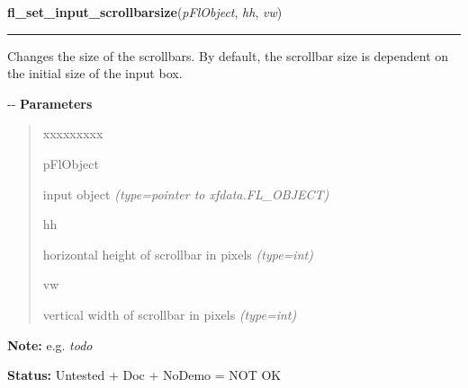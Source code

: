\hspace{.8\funcindent}\begin{boxedminipage}{\funcwidth}

    \raggedright \textbf{fl\_set\_input\_scrollbarsize}(\textit{pFlObject}, \textit{hh}, \textit{vw})

    \vspace{-1.5ex}

    \rule{\textwidth}{0.5\fboxrule}
\setlength{\parskip}{2ex}

Changes the size of the scrollbars. By default, the scrollbar size is
dependent on the initial size of the input box.

-{}-
\setlength{\parskip}{1ex}
      \textbf{Parameters}
      \vspace{-1ex}

      \begin{quote}
        \begin{Ventry}{xxxxxxxxx}

          \item[pFlObject]


input object
            {\it (type=pointer to xfdata.FL\_OBJECT)}

          \item[hh]


horizontal height of scrollbar in pixels
            {\it (type=int)}

          \item[vw]


vertical width of scrollbar in pixels
            {\it (type=int)}

        \end{Ventry}

      \end{quote}

\textbf{Note:} 
e.g. \emph{todo}


\textbf{Status:} 
Untested + Doc + NoDemo = NOT OK


    \end{boxedminipage}

    \label{xformslib:flinput:fl_get_input_scrollbarsize}

    \vspace{0.5ex}

